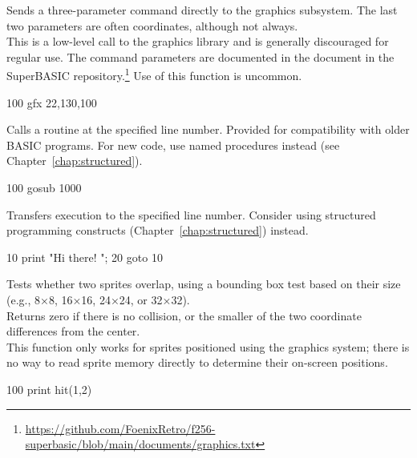 \begin{entry}
Sends a three-parameter command directly to the graphics subsystem. The last two parameters are often coordinates, although not always.\\

This is a low-level call to the graphics library and is generally discouraged for regular use. The command parameters are documented in the  document in the SuperBASIC repository.\footnote{\url{https://github.com/FoenixRetro/f256-superbasic/blob/main/documents/graphics.txt}} Use of this function is uncommon.

\begin{lstexample}
100 gfx 22,130,100
\end{lstexample}
\end{entry}

\begin{entry}
Calls a routine at the specified line number. Provided for compatibility with older BASIC programs. For new code, use named procedures instead (see Chapter~\ref{chap:structured}).

\begin{lstexample}
100 gosub 1000
\end{lstexample}
\end{entry}

\begin{entry}
Transfers execution to the specified line number. Consider using structured programming constructs (Chapter~\ref{chap:structured}) instead.

\begin{lstexample}
10 print "Hi there! ";
20 goto 10
\end{lstexample}
\end{entry}

\begin{entry}
Tests whether two sprites overlap, using a bounding box test based on their size (e.g., 8×8, 16×16, 24×24, or 32×32).\\

Returns zero if there is no collision, or the smaller of the two coordinate differences from the center.\\

This function only works for sprites positioned using the graphics system; there is no way to read sprite memory directly to determine their on-screen positions.

\begin{lstexample}
100 print hit(1,2)
\end{lstexample}
\end{entry}

